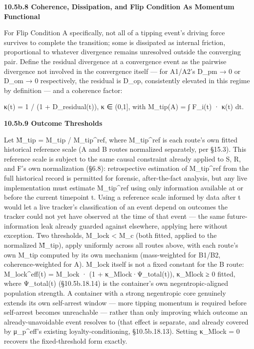 \documentclass[
]{article}
\begin{document}
\textbf{10.5b.8 Coherence, Dissipation, and Flip Condition As Momentum
Functional}

For Flip Condition A specifically, not all of a tipping event's driving
force survives to complete the transition; some is dissipated as
internal friction, proportional to whatever divergence remains
unresolved outside the converging pair. Define the residual divergence
at a convergence event as the pairwise divergence not involved in the
convergence itself --- for A1/A2's D\_pm → 0 or D\_om → 0 respectively,
the residual is D\_op, consistently elevated in this regime by
definition --- and a coherence factor:

κ(t) = 1 / (1 + D\_residual(t)), κ ∈ (0,1{]}, with M\_tip(A) = ∫ F\_i(t)
· κ(t) dt.

\textbf{10.5b.9 Outcome Thresholds}

Let M̃\_tip = M\_tip / M\_tip\^{}ref, where M\_tip\^{}ref is each route's
own fitted historical reference scale (A and B routes normalized
separately, per §15.3). This reference scale is subject to the same
causal constraint already applied to S, R, and F's own normalization
(§6.8): retrospective estimation of M\_tip\^{}ref from the full
historical record is permitted for forensic, after-the-fact analysis,
but any live implementation must estimate M\_tip\^{}ref using only
information available at or before the current timepoint t. Using a
reference scale informed by data after t would let a live tracker's
classification of an event depend on outcomes the tracker could not yet
have observed at the time of that event --- the same future-information
leak already guarded against elsewhere, applying here without exception.
Two thresholds, M\_lock \textless{} M\_c (both fitted, applied to the
normalized M̃\_tip), apply uniformly across all routes above, with each
route's own M\_tip computed by its own mechanism (mass-weighted for
B1/B2, coherence-weighted for A). M\_lock itself is not a fixed constant
for the B route: M\_lock\^{}eff(t) = M\_lock · (1 +
κ\_Mlock·Ψ\_total(t)), κ\_Mlock ≥ 0 fitted, where Ψ\_total(t)
(§10.5b.18.14) is the container's own negentropic-aligned population
strength. A container with a strong negentropic core genuinely extends
its own self-arrest window --- more tipping momentum is required before
self-arrest becomes unreachable --- rather than only improving which
outcome an already-unavoidable event resolves to (that effect is
separate, and already covered by μ\_p\^{}eff's existing
loyalty-conditioning, §10.5b.18.13). Setting κ\_Mlock = 0 recovers the
fixed-threshold form exactly.
\end{document}
